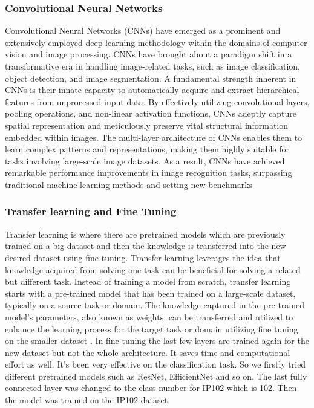 \subsubsection{Convolutional Neural Networks}
Convolutional Neural Networks \cite{lecun1998gradient} (CNNs) have emerged as a prominent and extensively employed deep learning methodology within the domains of computer vision and image processing. CNNs have brought about a paradigm shift in a transformative era in handling image-related tasks, such as image classification, object detection, and image segmentation. A fundamental strength inherent in CNNs is their innate capacity to automatically acquire and extract hierarchical features from unprocessed input data. By effectively utilizing convolutional layers, pooling operations, and non-linear activation functions, CNNs adeptly capture spatial representation and meticulously preserve vital structural information embedded within images. The multi-layer architecture of CNNs enables them to learn complex patterns and representations, making them highly suitable for tasks involving large-scale image datasets. As a result, CNNs have achieved remarkable performance improvements in image recognition tasks, surpassing traditional machine learning methods and setting new benchmarks

\subsubsection{Transfer learning and Fine Tuning}
Transfer learning is where there are pretrained models which are previously trained on a big dataset and then the knowledge is transferred into the new desired dataset using fine tuning. Transfer learning \cite{alzubaidi2021review} leverages the idea that knowledge acquired from solving one task can be beneficial for solving a related but different task. Instead of training a model from scratch, transfer learning starts with a pre-trained model that has been trained on a large-scale dataset, typically on a source task or domain. The knowledge captured in the pre-trained model's parameters, also known as weights, can be transferred and utilized to enhance the learning process for the target task or domain utilizing fine tuning on the smaller dataset \cite{feng2012boosting}. In fine tuning the last few layers are trained again for the new dataset but not the whole architecture. It saves time and computational effort as well. It’s been very effective on the classification task. So we firstly tried different pretrained models such as ResNet, EfficientNet and so on. The last fully connected layer was changed to the class number for IP102 which is 102. Then the model was trained on the IP102 dataset. 

